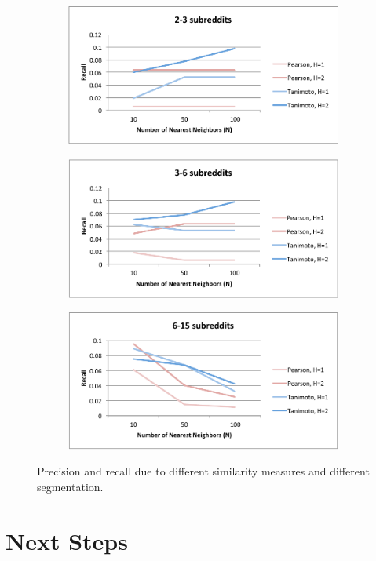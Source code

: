\documentclass{article}
\begin{document}
\begin{figure}[h]
\begin{subfigure}{.25\textwidth}
  \includegraphics[width=.9\linewidth]{img/2-3.pdf}
  \label{fig:2-3}
\end{subfigure}
\begin{subfigure}{.25\textwidth}
  \centering
  \includegraphics[width=.9\linewidth]{img/3-6.pdf}
  \label{fig:3-6}
\end{subfigure}
\begin{subfigure}{.25\textwidth}
  \centering
  \includegraphics[width=.9\linewidth]{img/6-15.pdf}
  \label{fig:2-3}
\end{subfigure}
\caption{Precision and recall due to different similarity measures and different segmentation.}\label{fig:learning-and-segments}
\end{figure}

\section{Next Steps}\label{sec:qualitative-evaluations}
\end{document}
